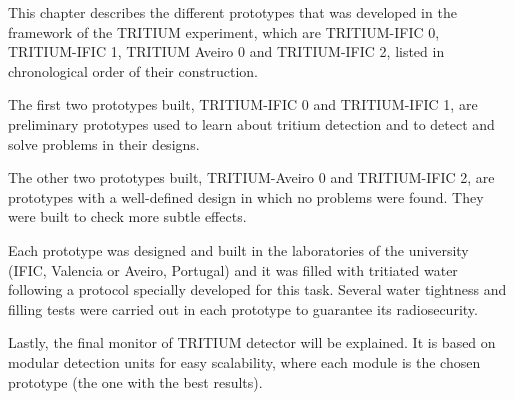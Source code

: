 This chapter describes the different prototypes that was developed in the framework of the TRITIUM experiment, which are TRITIUM-IFIC 0, TRITIUM-IFIC 1, TRITIUM Aveiro 0 and TRITIUM-IFIC 2, listed in chronological order of their construction.

The first two prototypes built, TRITIUM-IFIC 0 and TRITIUM-IFIC 1, are preliminary prototypes used to learn about tritium detection and to detect and solve problems in their designs.

The other two prototypes built, TRITIUM-Aveiro 0 and TRITIUM-IFIC 2, are prototypes with a well-defined design in which no problems were found. They were built to check more subtle effects. 

Each prototype was designed and built in the laboratories of the university (IFIC, Valencia or Aveiro, Portugal) and it was filled with tritiated water following a protocol specially developed for this task. Several water tightness and filling tests were carried out in each prototype to guarantee its radiosecurity.

Lastly, the final monitor of TRITIUM detector will be explained. It is based on modular detection units for easy scalability, where each module is the chosen prototype (the one with the best results).